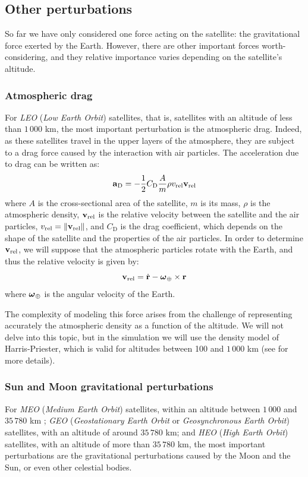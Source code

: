 \documentclass[../main.tex]{subfiles}
\begin{document}
\subsection{Other perturbations}
So far we have only considered one force acting on the satellite: the gravitational force exerted by the Earth. However, there are other important forces worth-considering, and they relative importance varies depending on the satellite's altitude.

\subsubsection{Atmospheric drag}
For \emph{LEO} (\emph{Low Earth Orbit}) satellites, that is, satellites with an altitude of less than $1\,000$ km, the most important perturbation is the atmospheric drag. Indeed, as these satellites travel in the upper layers of the atmosphere, they are subject to a drag force caused by the interaction with air particles. The acceleration due to drag can be written as:
\begin{equation}
  \boldsymbol{\mathrm{a}}_{\mathrm{D}}=-\frac{1}{2}C_{\mathrm{D}}\frac{A}{m}\rho v_\mathrm{rel}\boldsymbol{\mathrm{v}}_\mathrm{rel}
\end{equation}
where $A$ is the cross-sectional area of the satellite, $m$ is its mass, $\rho$ is the atmospheric density, $\boldsymbol{\mathrm{v}}_\mathrm{rel}$ is the relative velocity between the satellite and the air particles, $v_\mathrm{rel}=\left\|\boldsymbol{\mathrm{v}}_\mathrm{rel}\right\|$, and $C_{\mathrm{D}}$ is the drag coefficient, which depends on the shape of the satellite and the properties of the air particles. In order to determine $\boldsymbol{\mathrm{v}}_\mathrm{rel}$, we will suppose that the atmospheric particles rotate with the Earth, and thus the relative velocity is given by:
\begin{equation}
  \boldsymbol{\mathrm{v}}_\mathrm{rel}=\dot{\boldsymbol{\mathrm{r}}}-\boldsymbol{\mathrm{\omega}}_\oplus\times\boldsymbol{\mathrm{r}}
\end{equation}
where $\boldsymbol{\mathrm{\omega}}_\oplus$ is the angular velocity of the Earth.

The complexity of modeling this force arises from the challenge of representing accurately the atmospheric density as a function of the altitude. We will not delve into this topic, but in the simulation we will use the density model of Harris-Priester, which is valid for altitudes between 100 and $1\,000$ km (see \cite{montenbruck} for more details).

\subsubsection{Sun and Moon gravitational perturbations}
For \emph{MEO} (\emph{Medium Earth Orbit}) satellites, within an altitude between $1\,000$ and $35\,780$ km \cite{vallado}; \emph{GEO} (\emph{Geostationary Earth Orbit} or \emph{Geosynchronous Earth Orbit}) satellites, with an altitude of around $35\,780$ km; and \emph{HEO} (\emph{High Earth Orbit}) satellites, with an altitude of more than $35\,780$ km, the most important perturbations are the gravitational perturbations caused by the Moon and the Sun, or even other celestial bodies.
\end{document}
